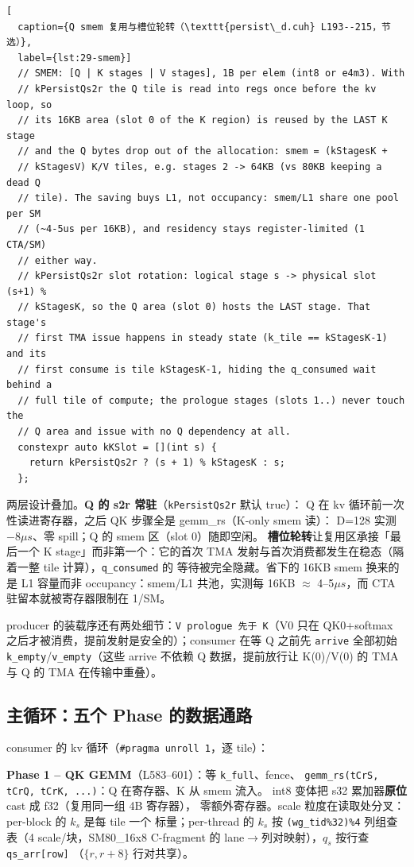 \begin{lstlisting}[
  caption={Q smem 复用与槽位轮转（\texttt{persist\_d.cuh} L193--215，节选）},
  label={lst:29-smem}]
  // SMEM: [Q | K stages | V stages], 1B per elem (int8 or e4m3). With
  // kPersistQs2r the Q tile is read into regs once before the kv loop, so
  // its 16KB area (slot 0 of the K region) is reused by the LAST K stage
  // and the Q bytes drop out of the allocation: smem = (kStagesK +
  // kStagesV) K/V tiles, e.g. stages 2 -> 64KB (vs 80KB keeping a dead Q
  // tile). The saving buys L1, not occupancy: smem/L1 share one pool per SM
  // (~4-5us per 16KB), and residency stays register-limited (1 CTA/SM)
  // either way.
  // kPersistQs2r slot rotation: logical stage s -> physical slot (s+1) %
  // kStagesK, so the Q area (slot 0) hosts the LAST stage. That stage's
  // first TMA issue happens in steady state (k_tile == kStagesK-1) and its
  // first consume is tile kStagesK-1, hiding the q_consumed wait behind a
  // full tile of compute; the prologue stages (slots 1..) never touch the
  // Q area and issue with no Q dependency at all.
  constexpr auto kKSlot = [](int s) {
    return kPersistQs2r ? (s + 1) % kStagesK : s;
  };
\end{lstlisting}

两层设计叠加。\textbf{Q 的 s2r 常驻}（\texttt{kPersistQs2r} 默认 true）：
Q 在 kv 循环前一次性读进寄存器，之后 QK 步骤全是 gemm\_rs（K-only smem 读）：
D=128 实测 $-8\mu s$、零 spill；Q 的 smem 区（slot 0）随即空闲。
\textbf{槽位轮转}让复用区承接「最后一个 K stage」而非第一个：它的首次 TMA
发射与首次消费都发生在稳态（隔着一整 tile 计算），\texttt{q\_consumed} 的
等待被完全隐藏。省下的 16KB smem 换来的是 L1 容量而非 occupancy：smem/L1
共池，实测每 16KB $\approx$ 4--5$\mu s$，而 CTA 驻留本就被寄存器限制在
1/SM。

producer 的装载序还有两处细节：\texttt{V prologue 先于 K}（V0 只在
QK0+softmax 之后才被消费，提前发射是安全的）；consumer 在等 Q 之前先
\texttt{arrive} 全部初始 \texttt{k\_empty}/\texttt{v\_empty}（这些 arrive
不依赖 Q 数据，提前放行让 K(0)/V(0) 的 TMA 与 Q 的 TMA 在传输中重叠）。

\subsection{主循环：五个 Phase 的数据通路}

consumer 的 kv 循环（\texttt{\#pragma unroll 1}，逐 tile）：

\textbf{Phase 1 -- QK GEMM}（L583--601）：等 \texttt{k\_full}、fence、
\texttt{gemm\_rs(tCrS, tCrQ, tCrK, ...)}：Q 在寄存器、K 从 smem 流入。
int8 变体把 s32 累加器\textbf{原位} cast 成 f32（复用同一组 4B 寄存器），
零额外寄存器。scale 粒度在读取处分叉：per-block 的 $k_s$ 是每 tile 一个
标量；per-thread 的 $k_s$ 按
\texttt{(wg\_tid\%32)\%4} 列组查表（4 scale/块，SM80\_16x8 C-fragment 的
lane$\to$列对映射），$q_s$ 按行查 \texttt{qs\_arr[row]}
（$\{r,r{+}8\}$ 行对共享）。

